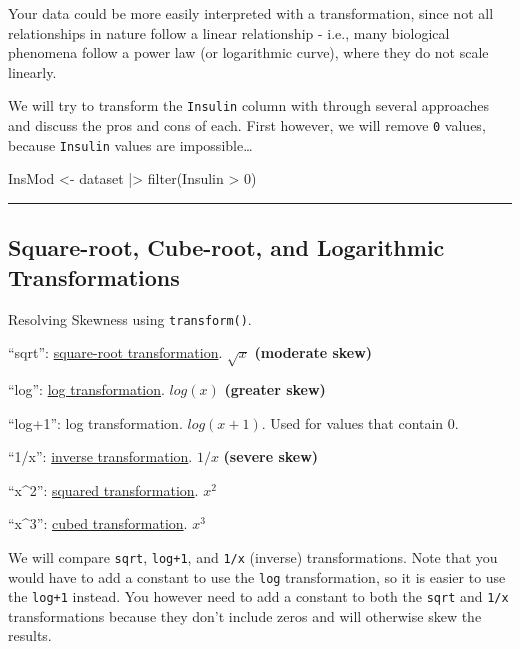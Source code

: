 \documentclass[
  letterpaper,
  DIV=11,
  numbers=noendperiod]{scrreprt}
\newenvironment{Shaded}{\begin{snugshade}}{\end{snugshade}}
\newcommand{\DecValTok}[1]{\textcolor[rgb]{0.68,0.00,0.00}{#1}}
\newcommand{\FunctionTok}[1]{\textcolor[rgb]{0.28,0.35,0.67}{#1}}
\newcommand{\NormalTok}[1]{\textcolor[rgb]{0.00,0.23,0.31}{#1}}
\newcommand{\OtherTok}[1]{\textcolor[rgb]{0.00,0.23,0.31}{#1}}
\newcommand{\SpecialCharTok}[1]{\textcolor[rgb]{0.37,0.37,0.37}{#1}}
\begin{document}
Your data could be more easily interpreted with a transformation, since
not all relationships in nature follow a linear relationship - i.e.,
many biological phenomena follow a power law (or logarithmic curve),
where they do not scale linearly.

We will try to transform the \texttt{Insulin} column with through
several approaches and discuss the pros and cons of each. First however,
we will remove \texttt{0} values, because \texttt{Insulin} values are
impossible\ldots{}

\begin{Shaded}
\begin{Highlighting}[]
\NormalTok{InsMod }\OtherTok{\textless{}{-}}\NormalTok{ dataset }\SpecialCharTok{|\textgreater{}}
  \FunctionTok{filter}\NormalTok{(Insulin }\SpecialCharTok{\textgreater{}} \DecValTok{0}\NormalTok{)}
\end{Highlighting}
\end{Shaded}

\begin{center}\rule{0.5\linewidth}{0.5pt}\end{center}

\hypertarget{square-root-cube-root-and-logarithmic-transformations}{%
\subsection{Square-root, Cube-root, and Logarithmic
Transformations}\label{square-root-cube-root-and-logarithmic-transformations}}

Resolving Skewness using \texttt{transform()}.

``sqrt'': \href{https://en.wikipedia.org/wiki/Square_root}{square-root
transformation}. \(\sqrt x\) \textbf{(moderate skew)}

``log'': \href{https://en.wikipedia.org/wiki/Logarithm}{log
transformation}. \(log(x)\) \textbf{(greater skew)}

``log+1'': log transformation. \(log(x + 1)\). Used for values that
contain 0.

``1/x'': \href{https://en.wikipedia.org/wiki/Inverse_function}{inverse
transformation}. \(1/x\) \textbf{(severe skew)}

``x\^{}2'':
\href{https://en.wikipedia.org/wiki/Quadratic_function}{squared
transformation}. \(x^2\)

``x\^{}3'': \href{https://en.wikipedia.org/wiki/Cubic_function}{cubed
transformation}. \(x^3\)

We will compare \texttt{sqrt}, \texttt{log+1}, and \texttt{1/x}
(inverse) transformations. Note that you would have to add a constant to
use the \texttt{log} transformation, so it is easier to use the
\texttt{log+1} instead. You however need to add a constant to both the
\texttt{sqrt} and \texttt{1/x} transformations because they don't
include zeros and will otherwise skew the results.
\end{document}
